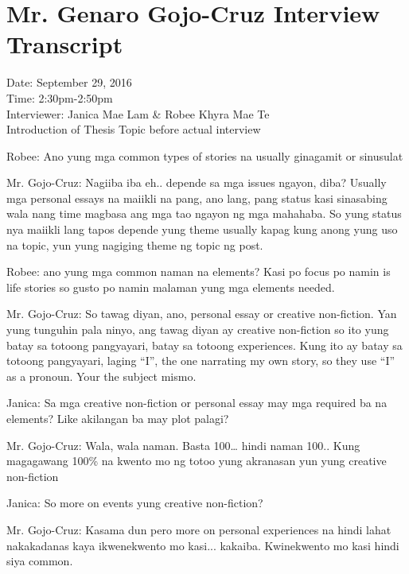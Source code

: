 %
%
%                 

\chapter{Mr. Genaro Gojo-Cruz Interview Transcript}
\label{sec:appendixc}

Date: September 29, 2016 \\
Time: 2:30pm-2:50pm \\
Interviewer: Janica Mae Lam \& Robee Khyra Mae Te \\

Introduction of Thesis Topic before actual interview

Robee: Ano yung mga common types of stories na usually ginagamit or sinusulat

Mr. Gojo-Cruz: Nagiiba iba eh.. depende sa mga issues ngayon, diba? Usually mga personal essays na maiikli na pang, ano lang, pang status kasi sinasabing wala nang time magbasa ang mga tao ngayon ng mga mahahaba. So yung status nya maiikli lang tapos depende yung theme usually kapag kung anong yung uso na topic, yun yung nagiging theme ng topic ng post.

Robee: ano yung mga common naman na elements? Kasi po focus po namin is life stories so gusto po namin malaman yung mga elements needed.

Mr. Gojo-Cruz: So tawag diyan, ano, personal essay or creative non-fiction. Yan yung tunguhin pala ninyo, ang tawag diyan ay creative non-fiction so ito yung batay sa totoong pangyayari, batay sa totoong experiences. Kung ito ay batay sa totoong pangyayari, laging ``I'', the one narrating my own story, so they use ``I'' as a pronoun. Your the subject mismo.

Janica: Sa mga creative non-fiction or personal essay may mga required ba na elements? Like akilangan ba may plot palagi?

Mr. Gojo-Cruz: Wala, wala naman. Basta 100… hindi naman 100.. Kung magagawang 100\% na kwento mo ng totoo yung akranasan yun yung creative non-fiction

Janica: So more on events yung creative non-fiction?

Mr. Gojo-Cruz: Kasama dun pero more on personal experiences na hindi lahat nakakadanas kaya  ikwenekwento mo kasi... kakaiba. Kwinekwento mo kasi hindi siya common. 

